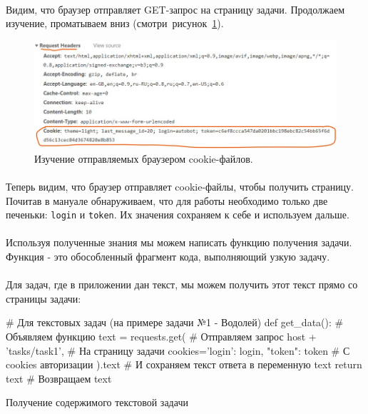 \documentclass[12pt]{article}
\begin{document}
    \paragraph{}
    Видим, что браузер отправляет GET-запрос на страницу задачи.
    Продолжаем изучение, проматываем вниз (смотри~рисунок~\ref{fig:browser2}).

    \begin{figure}[H]
        \centering
        \includegraphics[width=15cm]{BrowserNetworkAnalysis2}
        \caption{Изучение отправляемых браузером cookie-файлов.}
        \label{fig:browser2}
    \end{figure}
    \paragraph{}
    Теперь видим, что браузер отправляет cookie-файлы, чтобы получить страницу.
    Почитав в мануале обнаруживаем, что для работы необходимо только две печеньки: \verb|login| и \verb|token|.
    Их значения сохраняем к себе и используем дальше.
    \paragraph{}
    Используя полученные знания мы можем написать функцию получения задачи.
    Функция - это обособленный фрагмент кода, выполняющий узкую задачу.
    \paragraph{}
    Для задач, где в приложении дан текст, мы можем получить этот текст прямо со страницы задачи:

    \begin{listing}[H]
        \begin{pythoncode}
# Для текстовых задач (на примере задачи №1 - Водолей)
def get_data():                                   # Объявляем функцию
    text = requests.get(                          # Отправляем запрос
        host + 'tasks/task1',                     # На страницу задачи
        cookies={'login': login, "token": token}  # С cookies авторизации
    ).text                                        # И сохраняем текст ответа в переменную text
    return text                                   # Возвращаем text
        \end{pythoncode}
        \caption{Получение содержимого текстовой задачи}
        \label{lst:get_data_text}
    \end{listing}
\end{document}
